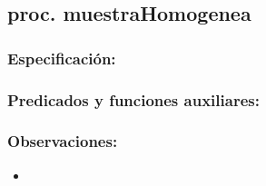 \subsection{proc. muestraHomogenea}
    \subsubsection{Especificaci\'on:}    
    \subsubsection{Predicados y funciones auxiliares:}
    \subsubsection{Observaciones:}
        \begin{itemize}
            \item
        \end{itemize}